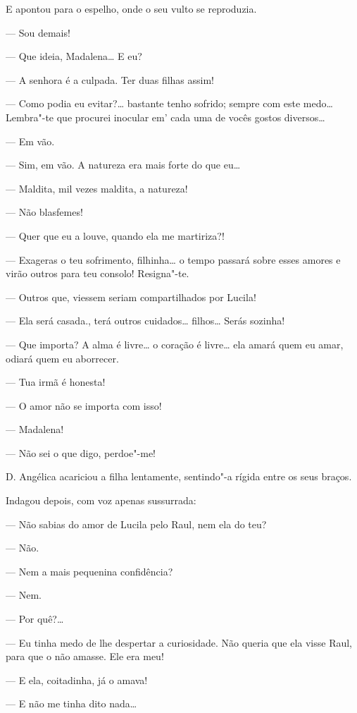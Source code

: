 E apontou para o espelho, onde o seu vulto se reproduzia.

--- Sou demais!

--- Que ideia, Madalena\ldots{} E eu?

--- A senhora é a culpada. Ter duas filhas assim!

--- Como podia eu evitar?\ldots{} bastante tenho sofrido; sempre com este
medo\ldots{} Lembra"-te que procurei inocular em' cada uma de vocês gostos
diversos\ldots{}

--- Em vão.

--- Sim, em vão. A natureza era mais forte do que eu\ldots{}

--- Maldita, mil vezes maldita, a natureza!

--- Não blasfemes!

--- Quer que eu a louve, quando ela me martiriza?!

--- Exageras o teu sofrimento, filhinha\ldots{} o tempo passará sobre esses
amores e virão outros para teu consolo! Resigna"-te.

--- Outros que, viessem seriam compartilhados por Lucila!

--- Ela será casada., terá outros cuidados\ldots{} filhos\ldots{} Serás sozinha!

--- Que importa? A alma é livre\ldots{} o coração é livre\ldots{} ela amará quem
eu amar, odiará quem eu aborrecer.

--- Tua irmã é honesta!

--- O amor não se importa com isso!

--- Madalena!

--- Não sei o que digo, perdoe"-me!

D. Angélica acariciou a filha lentamente, sentindo"-a rígida entre os
seus braços.

Indagou depois, com voz apenas sussurrada:

--- Não sabias do amor de Lucila pelo Raul, nem ela do teu?

--- Não.

--- Nem a mais pequenina confidência?

--- Nem.

--- Por quê?\ldots{}

--- Eu tinha medo de lhe despertar a curiosidade. Não queria que ela
visse Raul, para que o não amasse. Ele era meu!

--- E ela, coitadinha, já o amava!

--- E não me tinha dito nada\ldots{}

